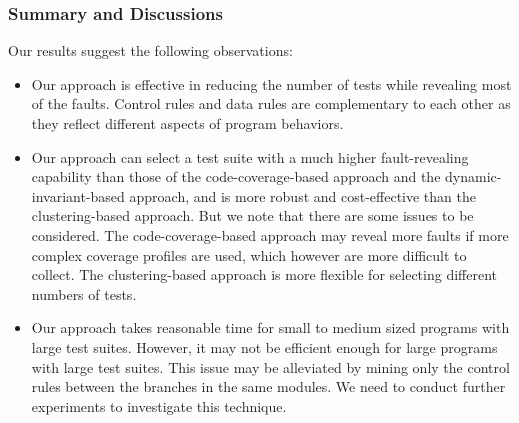 \documentclass{sig-alternate}
\begin{document}
\subsubsection{Summary and Discussions}

Our results suggest the following observations:

\begin{itemize}
\item %
Our approach is effective in reducing the number of tests while
revealing most of the faults. Control rules and data rules are
complementary to each other as they reflect different aspects of
program behaviors.


\item %
Our approach can select a test suite with a much higher
fault-revealing capability than those of the code-coverage-based
approach and the dynamic-invariant-based approach, and is more
robust and cost-effective than the clustering-based approach.
But we note that there are some issues to be considered. The
code-coverage-based approach may reveal more faults if more complex
coverage profiles are used, which however are more difficult to
collect. The clustering-based approach is more flexible for
selecting different numbers of tests.
\item %
Our approach takes reasonable time for small to medium sized
programs with large test suites. However, it may not be efficient
enough for large programs with large test suites. This issue may be
alleviated by mining only the control rules between the branches in
the same modules. We need to conduct further experiments to
investigate this technique.
\end{itemize}
\end{document}
